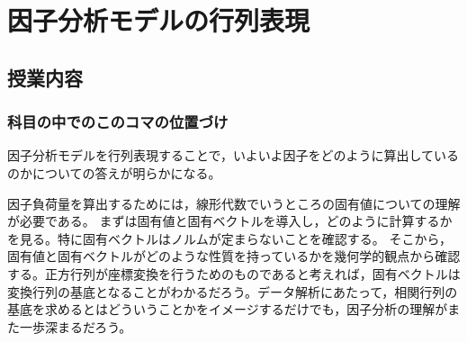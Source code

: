 \section{因子分析モデルの行列表現}
\subsection{授業内容}
\subsubsection{科目の中でのこのコマの位置づけ}
因子分析モデルを行列表現することで，いよいよ因子をどのように算出しているのかについての答えが明らかになる。

因子負荷量を算出するためには，線形代数でいうところの固有値についての理解が必要である。
まずは固有値と固有ベクトルを導入し，どのように計算するかを見る。特に固有ベクトルはノルムが定まらないことを確認する。
そこから，固有値と固有ベクトルがどのような性質を持っているかを幾何学的観点から確認する。正方行列が座標変換を行うためのものであると考えれば，固有ベクトルは変換行列の基底となることがわかるだろう。データ解析にあたって，相関行列の基底を求めるとはどういうことかをイメージするだけでも，因子分析の理解がまた一歩深まるだろう。
